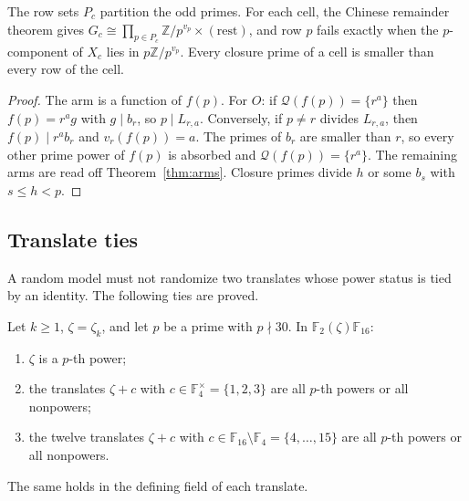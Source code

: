 \begin{proposition}\label{prop:model-cells}
The row sets $P_c$ partition the odd primes.  For each cell, the
Chinese remainder theorem gives
$G_c\cong\prod_{p\in P_c}\mathbb Z/p^{v_p}\times(\text{rest})$, and row $p$
fails exactly when the $p$-component of $X_c$ lies in $p\mathbb Z/p^{v_p}$.
Every closure prime of a cell is smaller than every row of the cell.
\end{proposition}

\begin{proof}
The arm is a function of $f(p)$.  For $O$: if $\mathcal Q(f(p))=\{r^a\}$
then $f(p)=r^ag$ with $g\mid b_r$, so $p\mid L_{r,a}$.  Conversely, if
$p\ne r$ divides $L_{r,a}$, then $f(p)\mid r^ab_r$ and $v_r(f(p))=a$.  The
primes of $b_r$ are smaller than $r$, so every other prime power of $f(p)$
is absorbed and $\mathcal Q(f(p))=\{r^a\}$.  The remaining arms are read off
Theorem~\ref{thm:arms}.  Closure primes divide $h$ or some $b_s$ with
$s\leq h<p$.
\end{proof}

\subsection{Translate ties}\label{sec:model-ties}

A random model must not randomize two translates whose power status is tied
by an identity.  The following ties are proved.

\begin{lemma}
\label{lem:model-ties}
Let $k\geq1$, $\zeta=\zeta_k$, and let $p$ be a prime with $p\nmid30$.  In
$\mathbb F_2(\zeta)\mathbb F_{16}$:
\begin{enumerate}
\item $\zeta$ is a $p$-th power;
\item the translates $\zeta+c$ with $c\in\mathbb F_4^{\times}=\{1,2,3\}$
      are all $p$-th powers or all nonpowers;
\item the twelve translates $\zeta+c$ with
      $c\in\mathbb F_{16}\setminus\mathbb F_4=\{4,\dots,15\}$ are all
      $p$-th powers or all nonpowers.
\end{enumerate}
The same holds in the defining field of each translate.
\end{lemma}

